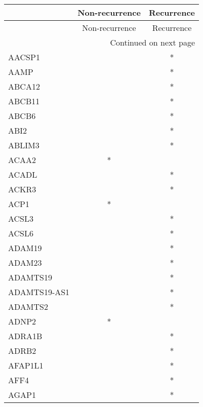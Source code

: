 \begin{longtable}{lcc}
\toprule
{} & Non-recurrence & Recurrence \\
\midrule
\endfirsthead

\toprule
{} & Non-recurrence & Recurrence \\
\midrule
\endhead
\midrule
\multicolumn{3}{r}{{Continued on next page}} \\
\midrule
\endfoot

\bottomrule
\endlastfoot
AACSP1          &                &          * \\
AAMP            &                &          * \\
ABCA12          &                &          * \\
ABCB11          &                &          * \\
ABCB6           &                &          * \\
ABI2            &                &          * \\
ABLIM3          &                &          * \\
ACAA2           &              * &            \\
ACADL           &                &          * \\
ACKR3           &                &          * \\
ACP1            &              * &            \\
ACSL3           &                &          * \\
ACSL6           &                &          * \\
ADAM19          &                &          * \\
ADAM23          &                &          * \\
ADAMTS19        &                &          * \\
ADAMTS19-AS1    &                &          * \\
ADAMTS2         &                &          * \\
ADNP2           &              * &            \\
ADRA1B          &                &          * \\
ADRB2           &                &          * \\
AFAP1L1         &                &          * \\
AFF4            &                &          * \\
AGAP1           &                &          * \\

\end{longtable}

